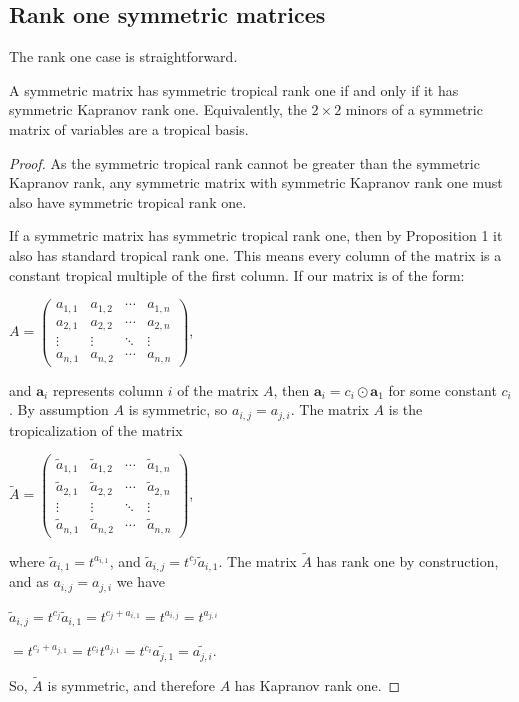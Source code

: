 \documentclass{article}
\begin{document}
\subsection{Rank one symmetric matrices}

The rank one case is straightforward.

\begin{thm}
  A symmetric matrix has symmetric tropical rank one if and only if it has symmetric Kapranov rank one. Equivalently, the $2 \times 2$ minors of a symmetric matrix of variables are a tropical basis.
\end{thm}

\begin{proof}
  As the symmetric tropical rank cannot be greater than the symmetric Kapranov rank, any symmetric matrix with symmetric Kapranov rank one must also have symmetric tropical rank one.
  
  If a symmetric matrix has symmetric tropical rank one, then by Proposition 1 it also has standard tropical rank one. This means every column of the matrix is a constant tropical multiple of the first column. If our matrix is of the form:
  \begin{center}
    $A = \left(\begin{array}{cccc} a_{1,1} & a_{1,2} & \cdots & a_{1,n} \\ a_{2,1} & a_{2,2} & \cdots & a_{2,n} \\ \vdots & \vdots & \ddots & \vdots \\ a_{n,1} & a_{n,2} & \cdots & a_{n,n} \end{array}\right)$,
  \end{center}
  and $\textbf{a}_{i}$ represents column $i$ of the matrix $A$, then $\textbf{a}_{i} = c_{i} \odot \textbf{a}_{1}$ for some constant $c_{i}$. By assumption $A$ is symmetric, so $a_{i,j} = a_{j,i}$. The matrix $A$ is the tropicalization of the matrix
  \begin{center}
    $\tilde{A} = \left(\begin{array}{cccc} \tilde{a}_{1,1} & \tilde{a}_{1,2} & \cdots & \tilde{a}_{1,n} \\ \tilde{a}_{2,1} & \tilde{a}_{2,2} & \cdots & \tilde{a}_{2,n} \\ \vdots & \vdots & \ddots & \vdots \\ \tilde{a}_{n,1} & \tilde{a}_{n,2} & \cdots & \tilde{a}_{n,n} \end{array}\right)$,
  \end{center}
  where $\tilde{a}_{i,1} = t^{a_{i,1}}$, and $\tilde{a}_{i,j} = t^{c_{j}}\tilde{a}_{i,1}$. The matrix $\tilde{A}$ has rank one by construction, and as $a_{i,j} = a_{j,i}$ we have 
  \begin{center}
    $\tilde{a}_{i,j} = t^{c_{j}}\tilde{a}_{i,1} = t^{c_{j} + a_{i,1}} = t^{a_{i,j}} = t^{a_{j,i}}$
    
    $= t^{c_{i} + a_{j,1}} = t^{c_{i}}t^{a_{j,1}} = t^{c_{i}}\tilde{a_{j,1}} = \tilde{a_{j,i}}$. 
  \end{center}
  So, $\tilde{A}$ is symmetric, and therefore $A$ has Kapranov rank one.
\end{proof}
\end{document}
